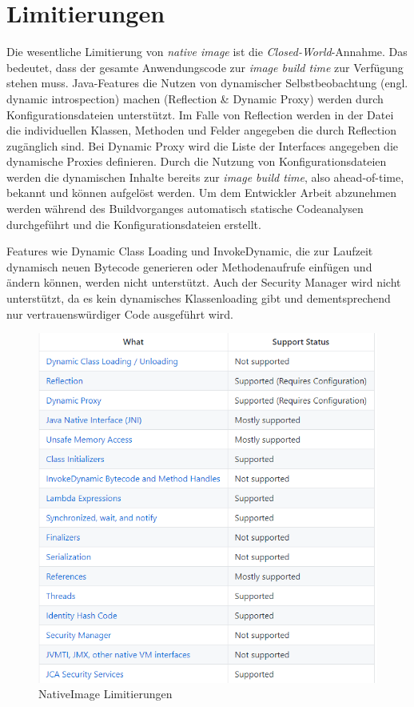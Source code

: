\section{Limitierungen}
\label{sec:limitierungen}

Die wesentliche Limitierung von \textit{native image} ist die \textit{Closed-World}-Annahme. Das bedeutet, dass der gesamte Anwendungscode zur \textit{image build time} zur Verfügung
stehen muss. Java-Features die Nutzen von dynamischer Selbstbeobachtung (engl. dynamic introspection) machen (Reflection \& Dynamic Proxy) werden durch Konfigurationsdateien unterstützt.
Im Falle von Reflection werden in der Datei die individuellen Klassen, Methoden  und Felder angegeben die durch Reflection zugänglich sind. Bei Dynamic Proxy wird die Liste der Interfaces
angegeben die dynamische Proxies definieren. Durch die Nutzung von Konfigurationsdateien werden die dynamischen Inhalte bereits zur \textit{image build time}, also ahead-of-time, bekannt und
können aufgelöst werden. Um dem Entwickler Arbeit abzunehmen werden während des Buildvorganges automatisch statische Codeanalysen durchgeführt und die Konfigurationsdateien erstellt.

Features wie Dynamic Class Loading und InvokeDynamic, die zur Laufzeit dynamisch neuen Bytecode generieren oder Methodenaufrufe einfügen und ändern können, werden nicht unterstützt.
Auch der Security Manager wird nicht unterstützt, da es kein dynamisches Klassenloading gibt und dementsprechend nur vertrauenswürdiger Code ausgeführt wird. 


\begin{figure}[h]
	\centering
	\includegraphics[width=.8\textwidth]{resources/limitations.png}
	\caption{NativeImage Limitierungen \parencite{GraalLimitiations}}
	\label{fig:system_limitations}
\end{figure}
